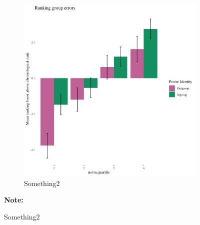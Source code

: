 \documentclass[12pt,letterpaper]{article}
\begin{document}
\begin{figure}[ht]
\begin{subfigure}{.5\textwidth}
        \includegraphics[width=1\linewidth]{Output/Graphs/Audit/Misranking relative to expectation/Chronological expectation/US NF by norm preference.jpg}  
        \caption{Something2}
        \label{fig:nf_rankingboost}
    \end{subfigure}

\footnotesize \textbf{Note:} 
\end{figure}

\end{document}
